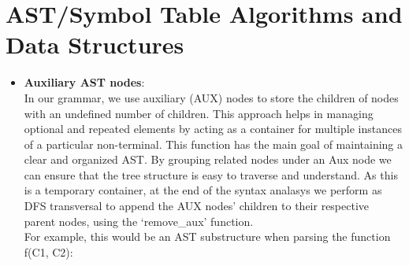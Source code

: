 \documentclass[12pt]{article}
\begin{document}
\section{AST/Symbol Table Algorithms and Data Structures}
    \begin{itemize}
        \item \textbf{Auxiliary AST nodes}: \\In our grammar, we use auxiliary (AUX) nodes to store the children of nodes with an undefined number of children. This approach helps in managing optional and repeated elements by acting as a container for multiple instances of a particular non-terminal. This function has the main goal of maintaining a clear and organized AST. By grouping related nodes under an Aux node we can ensure that the tree structure is easy to traverse and understand. As this is a temporary container, at the end of the syntax analasys we perform as DFS transversal to append the AUX nodes' children to their respective parent nodes, using the `remove\_aux' function.\\
        For example, this would be an AST substructure when parsing the function f(C1, C2):\\
        

\end{itemize}
\end{document}
